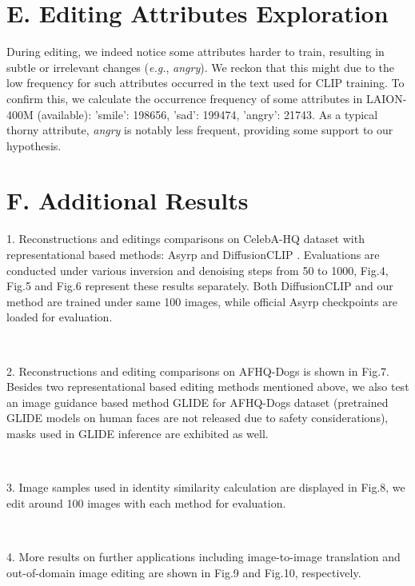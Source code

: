 \documentclass[letterpaper]{article} %
\begin{document}
\section{E. Editing Attributes Exploration}

During editing, we indeed notice some attributes  harder to train, resulting in subtle or irrelevant changes (\textit{e.g.}, \textit{angry}). We reckon that this might due to the low frequency for such attributes occurred in the text used for CLIP training. To confirm this, we calculate the occurrence frequency of some attributes in LAION-400M (available): 'smile': 198656, 'sad': 199474, 'angry': 21743. As a typical thorny attribute, \textit{angry} is notably less frequent, providing some support to our hypothesis.


\section{F. Additional Results}

1. Reconstructions and editings comparisons on CelebA-HQ dataset \cite{karras2017progressive} with representational based methods: Asyrp \cite{kwon2022diffusion} and DiffusionCLIP \cite{kim2022diffusionclip}. Evaluations are conducted under various inversion and denoising steps from 50 to 1000, Fig.4, Fig.5 and Fig.6 represent these results separately. Both DiffusionCLIP and our method are trained under same 100 images, while official Asyrp checkpoints are loaded for evaluation.

~\

2.  Reconstructions and editing comparisons on AFHQ-Dogs \cite{choi2020stargan} is shown in Fig.7. Besides two representational based editing methods mentioned above, we also test an image guidance based method GLIDE \cite{nichol2021glide} for AFHQ-Dogs dataset (pretrained GLIDE models on human faces are not released due to safety considerations), masks used in GLIDE inference are exhibited as well.

~\

3. Image samples used in identity similarity calculation are displayed in Fig.8, we edit around 100 images with each method for evaluation.

~\

4. More results on further applications including image-to-image translation and out-of-domain image editing are shown in Fig.9 and Fig.10, respectively.
\end{document}
